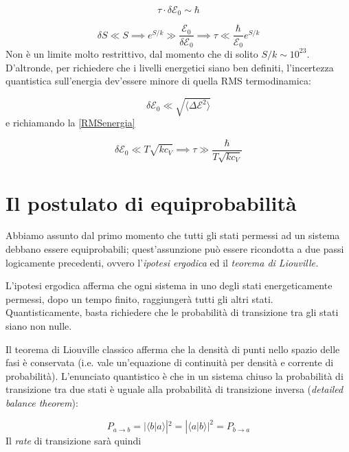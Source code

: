 \documentclass[a4paper]{report}
\begin{document}
\begin{equation}
    \tau \cdot\delta\mathcal{E}_0 \sim \hbar
\end{equation}

\begin{equation}
    \delta S \ll S \implies e^{S/k} \gg \frac{\mathcal{E}_0}{\delta \mathcal{E}_0} \implies \tau \ll \frac{\hbar}{\mathcal{E}_0}e^{S/k}
\end{equation}
Non è un limite molto restrittivo, dal momento che di solito $S/k \sim 10^{23}$. D'altronde, per richiedere che i livelli energetici siano ben definiti, l'incertezza quantistica sull'energia dev'essere minore di quella RMS termodinamica:

\begin{equation}
    \delta \mathcal{E}_0 \ll \sqrt{\langle\Delta \mathcal{E}^2\rangle}
\end{equation}
e richiamando la \eqref{RMSenergia}

\begin{equation}
    \delta \mathcal{E}_0 \ll T\sqrt{k c_V}\implies \tau \gg \frac{\hbar}{T\sqrt{k c_V}}
\end{equation}

\section{Il postulato di equiprobabilità}

Abbiamo assunto dal primo momento che tutti gli stati permessi ad un sistema debbano essere equiprobabili; quest'assunzione può essere ricondotta a due passi logicamente precedenti, ovvero l'\textit{ipotesi ergodica} ed il \textit{teorema di Liouville.}

L'ipotesi ergodica afferma che ogni sistema in uno degli stati energeticamente permessi, dopo un tempo finito, raggiungerà tutti gli altri stati. Quantisticamente, basta richiedere che le probabilità di transizione tra gli stati siano non nulle. 

Il teorema di Liouville classico afferma che la densità di punti nello spazio delle fasi è conservata (i.e. vale un'equazione di continuità per densità e corrente di probabilità). L'enunciato quantistico è che in un sistema chiuso la probabilità di transizione tra due stati è uguale alla probabilità di transizione inversa (\textit{detailed balance theorem}):

\begin{equation}
    P_{a\rightarrow b} = |\langle b|a\rangle|^2 = |\langle a |b \rangle|^2 =  P_{b\rightarrow a}
\end{equation}
Il \textit{rate} di transizione sarà quindi
\end{document}
